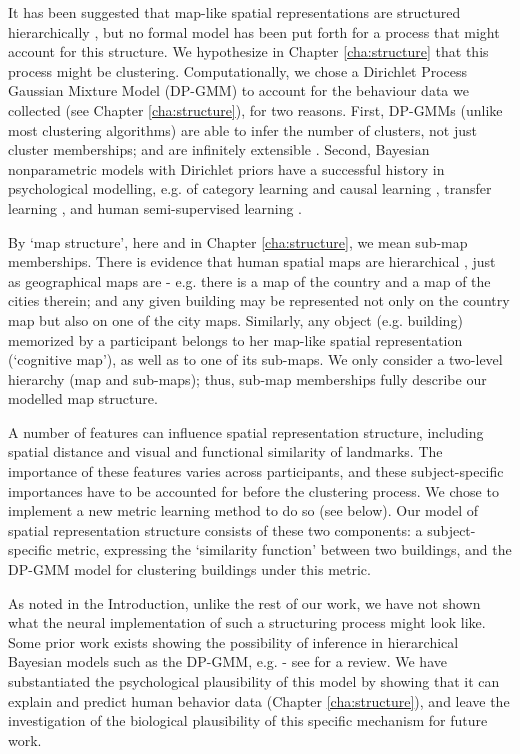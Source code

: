 It has been suggested that map-like spatial representations are structured hierarchically \citep{hirtle1985evidence,mcnamara1989subjective,greenauer2010micro}, but no formal model has been put forth for a process that might account for this structure. We hypothesize in Chapter \ref{cha:structure} that this process might be clustering. Computationally, we chose a Dirichlet Process Gaussian Mixture Model (DP-GMM) to account for the behaviour data we collected (see Chapter \ref{cha:structure}), for two reasons. First, DP-GMMs (unlike most clustering algorithms) are able to infer the number of clusters, not just cluster memberships; and are infinitely extensible \citep{rasmussen1999infinite}. Second, Bayesian nonparametric models with Dirichlet priors have a successful history in psychological modelling, e.g. of category learning and causal learning \citep{tenenbaum2011grow}, transfer learning \citep{canini2010modeling}, and human semi-supervised learning \citep{gibson2013human}.

By `map structure', here and in Chapter \ref{cha:structure}, we mean sub-map memberships. There is evidence that human spatial maps are hierarchical \citep{hirtle1985evidence,mcnamara1989subjective,greenauer2010micro}, just as geographical maps are - e.g. there is a map of the country and a map of the cities therein; and any given building may be represented not only on the country map but also on one of the city maps. Similarly, any object (e.g. building) memorized by a participant belongs to her map-like spatial representation (`cognitive map'), as well as to one of its sub-maps. We only consider a two-level hierarchy (map and sub-maps); thus, sub-map memberships fully describe our modelled map structure.

A number of features can influence spatial representation structure, including spatial distance and visual and functional similarity of landmarks. The importance of these features varies across participants, and these subject-specific importances have to be accounted for before the clustering process. We chose to implement a new metric learning method to do so (see below). Our model of spatial representation structure consists of these two components: a subject-specific metric, expressing the `similarity function' between two buildings, and the DP-GMM model for clustering buildings under this metric.

As noted in the Introduction, unlike the rest of our work, we have not shown what the neural implementation of such a structuring process might look like. Some prior work exists showing the possibility of inference in hierarchical Bayesian models such as the DP-GMM, e.g. \citep{shi2009neural} - see \citep{sanborn2015types} for a review. We have substantiated the psychological plausibility of this model by showing that it can explain and predict human behavior data (Chapter \ref{cha:structure}), and leave the investigation of the biological plausibility of this specific mechanism for future work.

